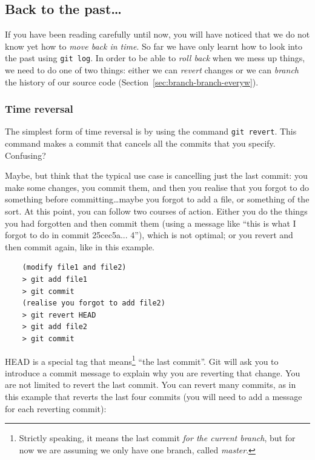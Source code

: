 \subsection{Back to the past\ldots}
\label{sec:branching}

If you have been reading carefully until now, you will have noticed
that we do not know yet how to \emph{move back in time}. So far we
have only learnt how to look into the past using \verb+git log+. In
order to be able to \emph{roll back} when we mess up things, we need
to do one of two things: either we can \emph{revert} changes or we can
\emph{branch} the history of our source code
(Section~\ref{sec:branch-branch-everyw}).

\subsubsection{Time reversal}
\label{sec:time-reversal}

The simplest form of time reversal is by using the command 
\verb+git revert+. This command makes a commit 
that cancels all the commits that
you specify. Confusing? 

Maybe, but think that the typical use case is cancelling just the last
commit: you make some changes, you commit them, and then you realise
that you forgot to do something before committing\ldots maybe you
forgot to add a file, or something of the sort. At this point, you can
follow two courses of action. Either you do the things you had
forgotten and then commit them (using a message like ``this is what I
forgot to do in commit 25cec5a... 4''), which is not optimal; or you
revert and then commit again, like in this example.

\begin{verbatim}
    (modify file1 and file2)
    > git add file1
    > git commit 
    (realise you forgot to add file2)
    > git revert HEAD
    > git add file2
    > git commit
\end{verbatim}

HEAD is a special tag that means\footnote{Strictly speaking, it means
  the last commit \emph{for the current branch}, but for now we are
  assuming we only have one branch, called \emph{master}.} ``the last
commit''. Git will ask you 
to introduce a commit message to explain why you are reverting that
change. You are not limited to revert the last commit. You can revert
many commits, as in this example that reverts the last four commits
(you will need to add a message for each reverting commit): 

